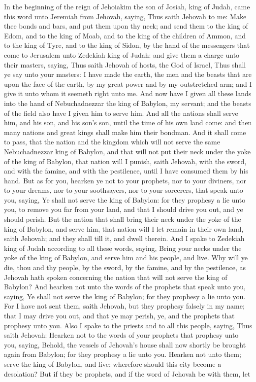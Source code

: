 In the beginning of the reign of Jehoiakim the son of Josiah, king of Judah, came this word unto Jeremiah from Jehovah, saying, Thus saith Jehovah to me: Make thee bonds and bars, and put them upon thy neck; and send them to the king of Edom, and to the king of Moab, and to the king of the children of Ammon, and to the king of Tyre, and to the king of Sidon, by the hand of the messengers that come to Jerusalem unto Zedekiah king of Judah: and give them a charge unto their masters, saying, Thus saith Jehovah of hosts, the God of Israel, Thus shall ye say unto your masters: I have made the earth, the men and the beasts that are upon the face of the earth, by my great power and by my outstretched arm; and I give it unto whom it seemeth right unto me. And now have I given all these lands into the hand of Nebuchadnezzar the king of Babylon, my servant; and the beasts of the field also have I given him to serve him. And all the nations shall serve him, and his son, and his son’s son, until the time of his own land come: and then many nations and great kings shall make him their bondman. And it shall come to pass, that the nation and the kingdom which will not serve the same Nebuchadnezzar king of Babylon, and that will not put their neck under the yoke of the king of Babylon, that nation will I punish, saith Jehovah, with the sword, and with the famine, and with the pestilence, until I have consumed them by his hand. But as for you, hearken ye not to your prophets, nor to your diviners, nor to your dreams, nor to your soothsayers, nor to your sorcerers, that speak unto you, saying, Ye shall not serve the king of Babylon: for they prophesy a lie unto you, to remove you far from your land, and that I should drive you out, and ye should perish. But the nation that shall bring their neck under the yoke of the king of Babylon, and serve him, that nation will I let remain in their own land, saith Jehovah; and they shall till it, and dwell therein.  And I spake to Zedekiah king of Judah according to all these words, saying, Bring your necks under the yoke of the king of Babylon, and serve him and his people, and live. Why will ye die, thou and thy people, by the sword, by the famine, and by the pestilence, as Jehovah hath spoken concerning the nation that will not serve the king of Babylon? And hearken not unto the words of the prophets that speak unto you, saying, Ye shall not serve the king of Babylon; for they prophesy a lie unto you. For I have not sent them, saith Jehovah, but they prophesy falsely in my name; that I may drive you out, and that ye may perish, ye, and the prophets that prophesy unto you.  Also I spake to the priests and to all this people, saying, Thus saith Jehovah: Hearken not to the words of your prophets that prophesy unto you, saying, Behold, the vessels of Jehovah’s house shall now shortly be brought again from Babylon; for they prophesy a lie unto you. Hearken not unto them; serve the king of Babylon, and live: wherefore should this city become a desolation? But if they be prophets, and if the word of Jehovah be with them, let 